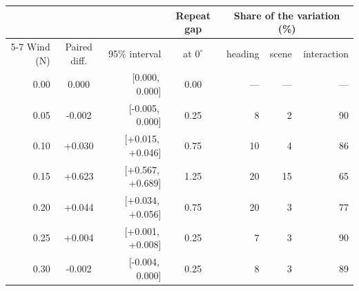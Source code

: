 \begin{tabular}{rcrcrrr}
\toprule
 & & & Repeat gap & \multicolumn{3}{c}{Share of the variation (\%)} \\
\cmidrule(lr){5-7}
Wind (N) & Paired diff. & 95\% interval & at $0^{\circ}$ & heading & scene & interaction \\
\midrule
0.00 & 0.000 & [0.000,\, 0.000] & 0.00 & --- & --- & --- \\
0.05 & -0.002 & [-0.005,\, 0.000] & 0.25 & 8 & 2 & 90 \\
0.10 & +0.030 & [+0.015,\, +0.046] & 0.75 & 10 & 4 & 86 \\
0.15 & +0.623 & [+0.567,\, +0.689] & 1.25 & 20 & 15 & 65 \\
0.20 & +0.044 & [+0.034,\, +0.056] & 0.75 & 20 & 3 & 77 \\
0.25 & +0.004 & [+0.001,\, +0.008] & 0.25 & 7 & 3 & 90 \\
0.30 & -0.002 & [-0.004,\, 0.000] & 0.25 & 8 & 3 & 89 \\
\bottomrule
\end{tabular}
